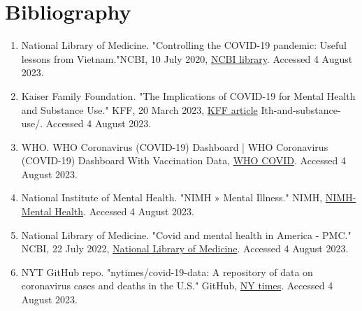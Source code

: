 \documentclass{article}
\begin{document}
\section{Bibliography}
\begin{enumerate}
\item National Library of Medicine. "Controlling the COVID-19 pandemic: Useful lessons from Vietnam."NCBI, 10 July 2020, \href{https://www.ncbi.nlm.nih.gov/pmc/articles/PMC7347475/}{NCBI library}. Accessed 4 August 2023.

  \item Kaiser Family Foundation. "The Implications of COVID-19 for Mental Health and Substance Use." KFF, 20 March 2023, \href{https://www.kff.org/coronavirus-covid-19/issue-brief/the-implications-of-covid-19-for-mental-hea}{KFF article} Ith-and-substance-use/. Accessed 4 August 2023.

  \item WHO. WHO Coronavirus (COVID-19) Dashboard | WHO Coronavirus (COVID-19) Dashboard With Vaccination Data, \href{https://covid19.who.int/}{WHO COVID}. Accessed 4 August 2023.

  \item National Institute of Mental Health. "NIMH $»$ Mental Illness." NIMH, \href{https://www.nimh.nih.gov/health/statistics/mental-illness}{NIMH-Mental Health}. Accessed 4 August 2023.

  \item National Library of Medicine. "Covid and mental health in America - PMC." NCBI, 22 July 2022, \href{https://www.ncbi.nlm.nih.gov/pmc/articles/PMC9307159/}{National Library of Medicine}. Accessed 4 August 2023.

  \item NYT GitHub repo. "nytimes/covid-19-data: A repository of data on coronavirus cases and deaths in the U.S." GitHub, \href{https://github.com/nytimes/covid-19-data}{NY times}. Accessed 4 August 2023.

\end{enumerate}
\end{document}
